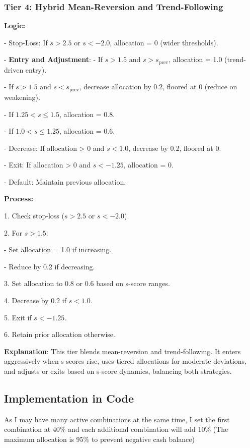 \documentclass[a4paper,12pt]{article}
\begin{document}
\subsubsection{Tier 4: Hybrid Mean-Reversion and Trend-Following}

\textbf{Logic:}

- Stop-Loss: If \(s > 2.5\) or \(s < -2.0\), allocation = 0 (wider thresholds).

- \textbf{Entry and Adjustment}:
  - If \(s > 1.5\) and \(s > s_{\text{prev}}\), allocation = 1.0 (trend-driven entry).
  
  - If \(s > 1.5\) and \(s < s_{\text{prev}}\), decrease allocation by 0.2, floored at 0 (reduce on weakening).
  
  - If \(1.25 < s \leq 1.5\), allocation = 0.8.
  
  - If \(1.0 < s \leq 1.25\), allocation = 0.6.
  
- Decrease: If allocation > 0 and \(s < 1.0\), decrease by 0.2, floored at 0.

- Exit: If allocation > 0 and \(s < -1.25\), allocation = 0.

- Default: Maintain previous allocation.

\textbf{Process:}

1. Check stop-loss (\(s > 2.5\) or \(s < -2.0\)).

2. For \(s > 1.5\):

   - Set allocation = 1.0 if increasing.
   
   - Reduce by 0.2 if decreasing.
   
3. Set allocation to 0.8 or 0.6 based on s-score ranges.

4. Decrease by 0.2 if \(s < 1.0\).

5. Exit if \(s < -1.25\).

6. Retain prior allocation otherwise.

\textbf{Explanation}: This tier blends mean-reversion and trend-following. It enters aggressively when s-scores rise, uses tiered allocations for moderate deviations, and adjusts or exits based on s-score dynamics, balancing both strategies.

\subsection{Implementation in Code}
As I may have many active combinations at the same time, I set the first combination at 40\% and each additional combination will add 10\% (The maximum allocation is 95\% to prevent negative cash balance)
\end{document}
